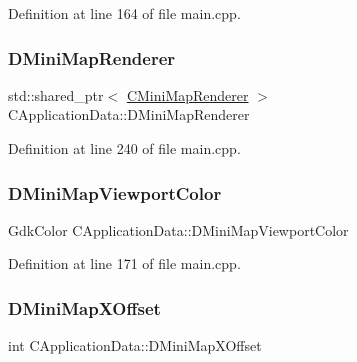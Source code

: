 Definition at line 164 of file main.\+cpp.

\hypertarget{classCApplicationData_a59b0f5dfe30ed5a54dd28aee98109e34}{}\label{classCApplicationData_a59b0f5dfe30ed5a54dd28aee98109e34} 
\subsubsection{\texorpdfstring{D\+Mini\+Map\+Renderer}{DMiniMapRenderer}}
{\footnotesize\ttfamily std\+::shared\+\_\+ptr$<$ \hyperlink{classCMiniMapRenderer}{C\+Mini\+Map\+Renderer} $>$ C\+Application\+Data\+::\+D\+Mini\+Map\+Renderer\hspace{0.3cm}{\ttfamily [protected]}}



Definition at line 240 of file main.\+cpp.

\hypertarget{classCApplicationData_a9a19207b43eece4000159fb1f1d831c3}{}\label{classCApplicationData_a9a19207b43eece4000159fb1f1d831c3} 
\subsubsection{\texorpdfstring{D\+Mini\+Map\+Viewport\+Color}{DMiniMapViewportColor}}
{\footnotesize\ttfamily Gdk\+Color C\+Application\+Data\+::\+D\+Mini\+Map\+Viewport\+Color\hspace{0.3cm}{\ttfamily [protected]}}



Definition at line 171 of file main.\+cpp.

\hypertarget{classCApplicationData_ae651b9d3963288c5c1f5aaf53bf9401d}{}\label{classCApplicationData_ae651b9d3963288c5c1f5aaf53bf9401d} 
\subsubsection{\texorpdfstring{D\+Mini\+Map\+X\+Offset}{DMiniMapXOffset}}
{\footnotesize\ttfamily int C\+Application\+Data\+::\+D\+Mini\+Map\+X\+Offset\hspace{0.3cm}{\ttfamily [protected]}}




